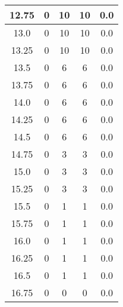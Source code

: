 \documentclass[letterpaper, 12pt]{article}
\begin{document}
\begin{longtable}{|c|c|c|c|c|}
\hline
12.75 & 0 & 10 & 10 & 0.0 \\
\hline
13.0 & 0 & 10 & 10 & 0.0 \\
\hline
13.25 & 0 & 10 & 10 & 0.0 \\
\hline
13.5 & 0 & 6 & 6 & 0.0 \\
\hline
13.75 & 0 & 6 & 6 & 0.0 \\
\hline
14.0 & 0 & 6 & 6 & 0.0 \\
\hline
14.25 & 0 & 6 & 6 & 0.0 \\
\hline
14.5 & 0 & 6 & 6 & 0.0 \\
\hline
14.75 & 0 & 3 & 3 & 0.0 \\
\hline
15.0 & 0 & 3 & 3 & 0.0 \\
\hline
15.25 & 0 & 3 & 3 & 0.0 \\
\hline
15.5 & 0 & 1 & 1 & 0.0 \\
\hline
15.75 & 0 & 1 & 1 & 0.0 \\
\hline
16.0 & 0 & 1 & 1 & 0.0 \\
\hline
16.25 & 0 & 1 & 1 & 0.0 \\
\hline
16.5 & 0 & 1 & 1 & 0.0 \\
\hline
16.75 & 0 & 0 & 0 & 0.0 \\
\hline
\end{longtable}
\end{document}
